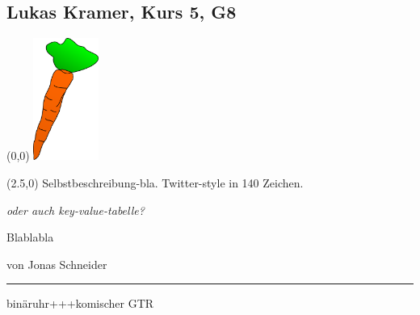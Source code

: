 \subsection*{Lukas Kramer, Kurs 5, G8}
\begin{textblock}{2.5}(0,0)
	\noindent\mbox{\includegraphics[height=4cm ]{karotte2.png}} %
\end{textblock}

\begin{textblock}{10}(2.5,0)
	\setlength{\parindent}{0cm}
	Selbstbeschreibung-bla. Twitter-style in 140 Zeichen.
	
	{\em oder auch key-value-tabelle?}
\end{textblock}

\vspace{4.5cm}
Blablabla

\vspace{3mm}
von Jonas Schneider
\vfill
\hrule
\vspace{2mm}
{\small
binäruhr+++komischer GTR
}

\newpage
